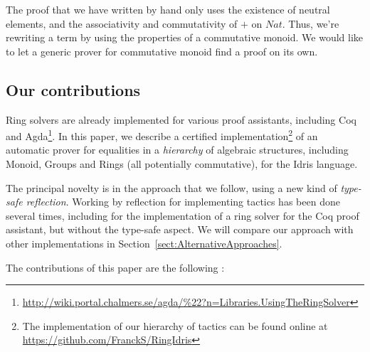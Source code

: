 The proof that we have written by hand only uses the existence of neutral elements, and the associativity and commutativity of $+$ on $Nat$. Thus, we're rewriting a term by using the properties of a commutative monoid. We would like to let a generic prover for commutative monoid find a proof on its own.

\subsection{Our contributions}

Ring solvers are already implemented for various proof
assistants, including Coq~\cite{Coq2005} and Agda\footnote{\url{http://wiki.portal.chalmers.se/agda/\%22?n=Libraries.UsingTheRingSolver}}. 
In this paper, we describe a certified
implementation\footnote{The implementation of our hierarchy of tactics can be found online at \url{https://github.com/FranckS/RingIdris}} of an automatic prover for equalities in a \emph{hierarchy} of algebraic
structures, including Monoid, Groups and Rings (all potentially commutative),
for the Idris language. 

The principal novelty is in the approach that we follow, using a
new kind of \emph{type-safe reflection}.  Working by reflection for implementing tactics has been done several times, including for the implementation of a ring solver for the Coq proof assistant, but without the type-safe aspect. We will
compare our approach with other implementations in Section~\ref{sect:AlternativeApproaches}.

The contributions of this paper are the following :

